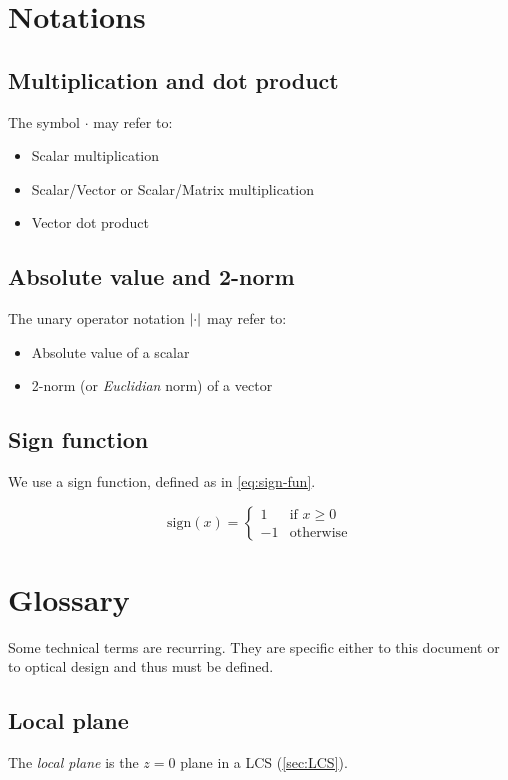 \section{Notations}
\subsection{Multiplication and dot product}
The symbol $\cdot$ may refer to:
\begin{itemize}
\item Scalar multiplication
\item Scalar/Vector or Scalar/Matrix multiplication
\item Vector dot product
\end{itemize}

\subsection{Absolute value and 2-norm}
The unary operator notation $\abs{\cdot}$ may refer to:
\begin{itemize}
\item Absolute value of a scalar
\item 2-norm (or \emph{Euclidian} norm) of a vector
\end{itemize}

\subsection{Sign function}
We use a sign function, defined as in \cref{eq:sign-fun}.

\begin{equation} \label{eq:sign-fun}
\textrm{sign}(x) = \begin{cases}
1 & \text{if } x \geq 0 \\
-1 & \text{otherwise}
\end{cases} \end{equation}

\section{Glossary}
Some technical terms are recurring. They are specific either to this document
or to optical design and thus must be defined.

\subsection{Local plane}
The \emph{local plane} is the $z=0$ plane in a \gls{LCS} (\cref{sec:LCS}).

